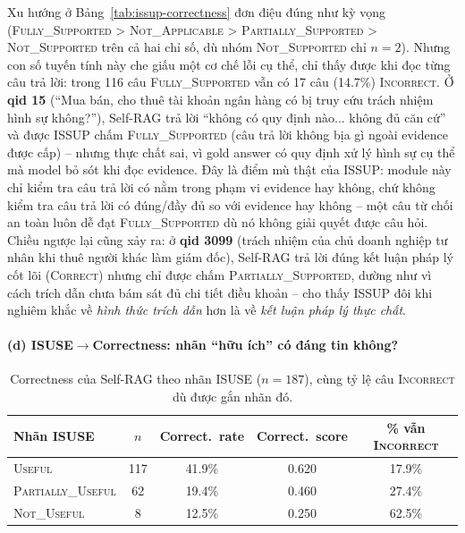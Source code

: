 \documentclass[11pt]{article}
\begin{document}
Xu hướng ở Bảng~\ref{tab:issup-correctness} đơn điệu đúng như kỳ vọng (\textsc{Fully\_Supported} > \textsc{Not\_Applicable} > \textsc{Partially\_Supported} > \textsc{Not\_Supported} trên cả hai chỉ số, dù nhóm \textsc{Not\_Supported} chỉ $n=2$). Nhưng con số tuyến tính này che giấu một cơ chế lỗi cụ thể, chỉ thấy được khi đọc từng câu trả lời: trong 116 câu \textsc{Fully\_Supported} vẫn có 17 câu (14.7\%) \textsc{Incorrect}. Ở \textbf{qid 15} (``Mua bán, cho thuê tài khoản ngân hàng có bị truy cứu trách nhiệm hình sự không?''), Self-RAG trả lời ``không có quy định nào... không đủ căn cứ'' và được \textsc{ISSUP} chấm \textsc{Fully\_Supported} (câu trả lời không bịa gì ngoài evidence được cấp) -- nhưng thực chất sai, vì gold answer có quy định xử lý hình sự cụ thể mà model bỏ sót khi đọc evidence. Đây là điểm mù thật của \textsc{ISSUP}: module này chỉ kiểm tra câu trả lời có nằm trong phạm vi evidence hay không, chứ không kiểm tra câu trả lời có đúng/đầy đủ so với evidence hay không -- một câu từ chối an toàn luôn dễ đạt \textsc{Fully\_Supported} dù nó không giải quyết được câu hỏi. Chiều ngược lại cũng xảy ra: ở \textbf{qid 3099} (trách nhiệm của chủ doanh nghiệp tư nhân khi thuê người khác làm giám đốc), Self-RAG trả lời đúng kết luận pháp lý cốt lõi (\textsc{Correct}) nhưng chỉ được chấm \textsc{Partially\_Supported}, dường như vì cách trích dẫn chưa bám sát đủ chi tiết điều khoản -- cho thấy \textsc{ISSUP} đôi khi nghiêm khắc về \emph{hình thức trích dẫn} hơn là về \emph{kết luận pháp lý thực chất}.

\paragraph{(d) \textsc{ISUSE}$\to$Correctness: nhãn ``hữu ích'' có đáng tin không?}

\begin{table}[t]
\centering
\small
\begin{tabular}{@{}lcccc@{}}
\toprule
\textbf{Nhãn \textsc{ISUSE}} & \textbf{$n$} & \textbf{Correct.\ rate} & \textbf{Correct.\ score} & \textbf{\% vẫn \textsc{Incorrect}} \\
\midrule
\textsc{Useful} & 117 & 41.9\% & 0.620 & 17.9\% \\
\textsc{Partially\_Useful} & 62 & 19.4\% & 0.460 & 27.4\% \\
\textsc{Not\_Useful} & 8 & 12.5\% & 0.250 & 62.5\% \\
\bottomrule
\end{tabular}
\caption{Correctness của Self-RAG theo nhãn \textsc{ISUSE} ($n=187$), cùng tỷ lệ câu \textsc{Incorrect} dù được gắn nhãn đó.}
\label{tab:isuse-correctness}
\end{table}
\end{document}
